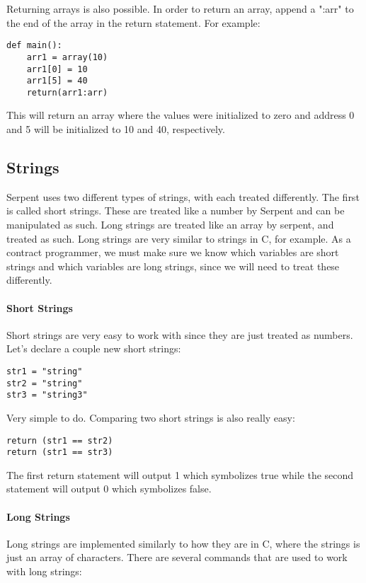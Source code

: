 \documentclass[12pt]{article}
\begin{document}
Returning arrays is also possible. In order to return an array, append a ":arr" to the end of the array in the return statement. For example:

\begin{lstlisting}
def main():
	arr1 = array(10)
	arr1[0] = 10
	arr1[5] = 40
	return(arr1:arr)
\end{lstlisting}

This will return an array where the values were initialized to zero and address 0 and 5 will be initialized to 10 and 40, respectively.



\subsection{Strings}
	Serpent uses two different types of strings, with each treated differently. The first is called short strings. These are treated like a number by Serpent and can be manipulated as such. Long strings are treated like an array by serpent, and treated as such. Long strings are very similar to strings in C, for example. As a contract programmer, we must make sure we know which variables are short strings and which variables are long strings, since we will need to treat these differently.

\paragraph{Short Strings}
	Short strings are very easy to work with since they are just treated as numbers. Let's declare a couple new short strings:
	
\begin{lstlisting}
str1 = "string"
str2 = "string"
str3 = "string3"
\end{lstlisting}

Very simple to do. Comparing two short strings is also really easy:

\begin{lstlisting}
return (str1 == str2)
return (str1 == str3)
\end{lstlisting}

The first return statement will output 1 which symbolizes true while the second statement will output 0 which symbolizes false. 

\paragraph{Long Strings}
Long strings are implemented similarly to how they are in C, where the strings is just an array of characters. There are several commands that are used to work with long strings:
\end{document}
